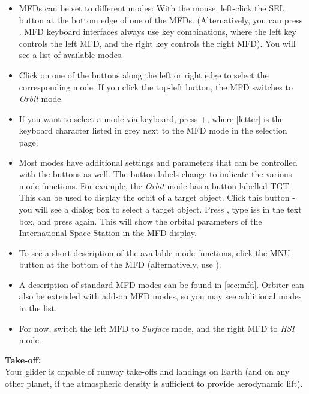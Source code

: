 \documentclass[Orbiter User Manual.tex]{subfiles}
\begin{document}
\begin{itemize}
\item MFDs can be set to different modes: With the mouse, left-click the SEL button at the bottom edge of one of the MFDs. (Alternatively, you can press \Shift{}. MFD keyboard interfaces always use \Shift key combinations, where the left \Shift key controls the left MFD, and the right \Shift key controls the right MFD). You will see a list of available modes.
\item Click on one of the buttons along the left or right edge to select the corresponding mode. If you click the top-left button, the MFD switches to \textit{Orbit} mode.
\item If you want to select a mode via keyboard, press \Shift{}+\Shift[letter], where [letter] is the keyboard character listed in grey next to the MFD mode in the selection page.
\item Most modes have additional settings and parameters that can be controlled with the buttons as well. The button labels change to indicate the various mode functions. For example, the \textit{Orbit} mode has a button labelled TGT. This can be used to display the orbit of a target object. Click this button - you will see a dialog box to select a target object. Press \Enter, type iss in the text box, and press \Enter again. This will show the orbital parameters of the International Space Station in the MFD display.
\item To see a short description of the available mode functions, click the MNU button at the bottom of the MFD (alternatively, use \Shift{}).
\item A description of standard MFD modes can be found in \ref{sec:mfd}. Orbiter can also be extended with add-on MFD modes, so you may see additional modes in the list.
\item For now, switch the left MFD to \textit{Surface} mode, and the right MFD to \textit{HSI} mode.
\end{itemize}

\noindent
\begin{figure}[H]
	\centering
\end{figure}

\noindent
\textbf{Take-off:}\\
Your glider is capable of runway take-offs and landings on Earth (and on any other planet, if the atmospheric density is sufficient to provide aerodynamic lift).
\end{document}
